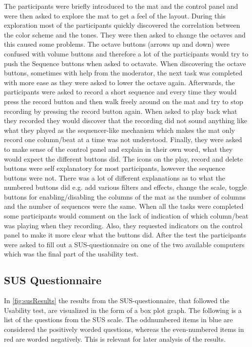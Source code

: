 The participants were briefly introduced to the mat and the control panel and were then asked to explore the mat to get a feel of the layout. During this exploration most of the participants quickly discovered the correlation between the color scheme and the tones. They were then asked to change the octaves and this caused some problems. The octave buttons (arrows up and down) were confused with volume buttons and therefore a lot of the participants would try to push the Sequence buttons when asked to octavate. When discovering the octave buttons, sometimes with help from the moderator, the next task was completed with more ease as they were asked to lower the octave again. Afterwards, the participants were asked to record a short sequence and every time they would press the record button and then walk freely around on the mat and try to stop recording by pressing the record button again. When asked to play back what they recorded they would discover that the recording did not sound anything like what they played as the sequencer-like mechanism which makes the mat only record one column/beat at a time was not understood. Finally, they were asked to make sense of the control panel and explain in their own word, what they would expect the different buttons did. The icons on the play, record and delete buttons were self explanatory for most participants, however the sequence buttons were not. There was a lot of different explanations as to what the numbered buttons did e.g. add various filters and effects, change the scale, toggle buttons for enabling/disabling the columns of the mat as the number of columns and the number of sequences were the same. When all the tasks were completed some participants would comment on the lack of indication of which column/beat was playing when they recording. Also, they requested indicators on the control panel to make it more clear what the buttons did. After the test the participants were asked to fill out a SUS-questionnaire on one of the two available computers which was the final part of the usability test.

\subsection{SUS Questionnaire}
In \autoref{fig:susResults} the results from the SUS-questionnaire, that followed the Usability test, are visualized in the form of a box plot graph. The following is a list of the questions from the SUS scale. The oddnumbered items in blue are considered the positively worded questions, whereas the even-numbered items in red are worded negatively. This is relevant for later analysis of the results.\\

